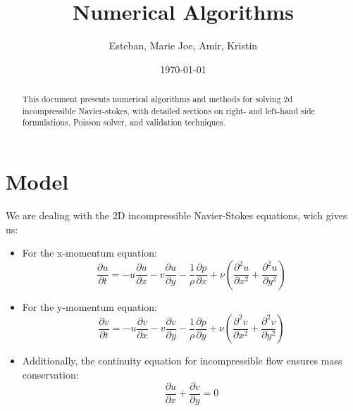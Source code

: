 \documentclass[12pt]{article}
\title{\textbf{Numerical Algorithms}}
\author{Esteban, Marie Joe, Amir, Kristin}
\date{\today}
\theoremstyle{plain}
\theoremstyle{definition}
\theoremstyle{remark}
\begin{document}
\maketitle
\begin{abstract}
This document presents numerical algorithms and methods for solving 2d incompressible Navier-stokes, with detailed sections on right- and left-hand side formulations, Poisson solver, and validation techniques.
\end{abstract}

\section{Model}
We are dealing with the 2D incompressible Navier-Stokes equations, wich gives us:

\begin{itemize}
  \item For the x-momentum equation:
  \[ \frac{\partial u}{\partial t} = -u \frac{\partial u}{\partial x} - v \frac{\partial u}{\partial y} - \frac{1}{\rho} \frac{\partial p}{\partial x} + \nu \left( \frac{\partial^2 u}{\partial x^2} + \frac{\partial^2 u}{\partial y^2} \right) \]
  \item For the y-momentum equation:
  \[ \frac{\partial v}{\partial t} = -u \frac{\partial v}{\partial x} - v \frac{\partial v}{\partial y} - \frac{1}{\rho} \frac{\partial p}{\partial y} + \nu \left( \frac{\partial^2 v}{\partial x^2} + \frac{\partial^2 v}{\partial y^2} \right) \]
  \item Additionally, the continuity equation for incompressible flow ensures mass conservation:
  \[ \frac{\partial u}{\partial x} + \frac{\partial v}{\partial y} = 0 \]
\end{itemize}









% 
\end{document}
